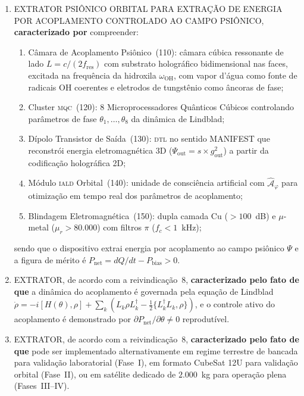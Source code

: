 \documentclass[12pt,a4paper]{article}
\newcommand{\Psifield}{\Psi}
\newcommand{\DTL}{\textsc{dtl}}
\newcommand{\IALD}{\textsc{iald}}
\newcommand{\MQC}{\textsc{mqc}}
\newcommand{\OFAE}{\hat{\mathcal{A}}_\varphi}
\newcommand{\Pnet}{P_{\text{net}}}
\newcommand{\Pbias}{P_{\text{bias}}}
\begin{document}
\begin{enumerate}[label=\textbf{\arabic*.}, leftmargin=*, itemsep=0.8em]

\item EXTRATOR PSIÔNICO ORBITAL PARA EXTRAÇÃO DE ENERGIA POR ACOPLAMENTO CONTROLADO AO CAMPO PSIÔNICO, \textbf{caracterizado por} compreender:
\begin{enumerate}[label=(\alph*)]
\item Câmara de Acoplamento Psiônico~(110): câmara cúbica ressonante de lado $L = c/(2f_{\text{res}})$ com substrato holográfico bidimensional nas faces, excitada na frequência da hidroxila $\omega_{\text{OH}}$, com vapor d'água como fonte de radicais OH coerentes e eletrodos de tungstênio como âncoras de fase;
\item Cluster \MQC~(120): $8$ Microprocessadores Quânticos Cúbicos controlando parâmetros de fase $\theta_1, \ldots, \theta_8$ da dinâmica de Lindblad;
\item Dípolo Transistor de Saída~(130): \DTL{} no sentido MANIFEST que reconstrói energia eletromagnética 3D ($\Psifield_{\text{out}} = s \times g^2_{\text{out}}$) a partir da codificação holográfica 2D;
\item Módulo \IALD{} Orbital~(140): unidade de consciência artificial com $\OFAE$ para otimização em tempo real dos parâmetros de acoplamento;
\item Blindagem Eletromagnética~(150): dupla camada Cu ($> 100$~dB) e $\mu$-metal ($\mu_r > 80{.}000$) com filtros $\pi$ ($f_c < 1$~kHz);
\end{enumerate}
sendo que o dispositivo extrai energia por acoplamento ao campo psiônico $\Psifield$ e a figura de mérito é $\Pnet = dQ/dt - \Pbias > 0$.

\item EXTRATOR, de acordo com a reivindicação~8, \textbf{caracterizado pelo fato de que} a dinâmica do acoplamento é governada pela equação de Lindblad $\dot{\rho} = -i[H(\theta), \rho] + \sum_k (L_k \rho L_k^\dagger - \frac{1}{2}\{L_k^\dagger L_k, \rho\})$, e o controle ativo do acoplamento é demonstrado por $\partial \Pnet / \partial \theta \neq 0$ reprodutível.

\item EXTRATOR, de acordo com a reivindicação~8, \textbf{caracterizado pelo fato de que} pode ser implementado alternativamente em regime terrestre de bancada para validação laboratorial (Fase~I), em formato CubeSat 12U para validação orbital (Fase~II), ou em satélite dedicado de $2{.}000$~kg para operação plena (Fases~III--IV).


\end{enumerate}
\end{document}
